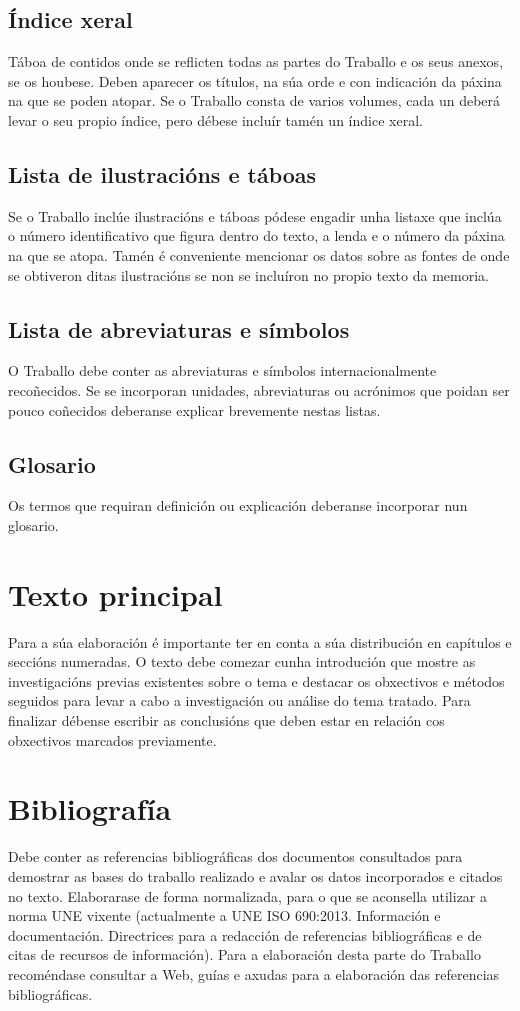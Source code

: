 \subsection{Índice xeral}
Táboa de contidos onde se reflicten todas as partes do Traballo e os seus anexos, se os houbese. Deben aparecer os títulos, na súa orde e con indicación da páxina na que se poden atopar.
Se o Traballo consta de varios volumes, cada un deberá levar o seu propio índice, pero débese incluír tamén un índice xeral.
\subsection{Lista de ilustracións e táboas}
Se o Traballo inclúe ilustracións e táboas pódese engadir unha listaxe que inclúa o número identificativo que figura dentro do texto, a lenda e o número da páxina na que se atopa.
Tamén é conveniente mencionar os datos sobre as fontes de onde se obtiveron ditas ilustracións se non se incluíron no propio texto da memoria.
\subsection{Lista de abreviaturas e símbolos}
O Traballo debe conter as abreviaturas e símbolos internacionalmente recoñecidos. Se se incorporan unidades, abreviaturas ou acrónimos que poidan ser pouco coñecidos deberanse explicar brevemente nestas listas.
\subsection{Glosario}
Os termos que requiran definición ou explicación deberanse incorporar nun glosario.

\section{Texto principal}
Para a súa elaboración é importante ter en conta a súa distribución en capítulos e seccións numeradas. 
O texto debe comezar cunha introdución que mostre as investigacións previas existentes sobre o tema e destacar os obxectivos e métodos seguidos para levar a cabo a investigación ou análise do tema tratado.
Para finalizar débense escribir as conclusións que deben estar en relación cos obxectivos marcados previamente.

\section{Bibliografía}
Debe conter as referencias bibliográficas dos documentos consultados para demostrar as bases do traballo realizado e avalar os datos incorporados e citados no texto.
Elaborarase de forma normalizada, para o que se aconsella utilizar a norma UNE vixente (actualmente a UNE ISO 690:2013. Información e documentación. Directrices para a redacción de referencias bibliográficas e de citas de recursos de información).
Para a elaboración desta parte do Traballo recoméndase consultar a Web, guías e axudas para a elaboración das referencias bibliográficas.

